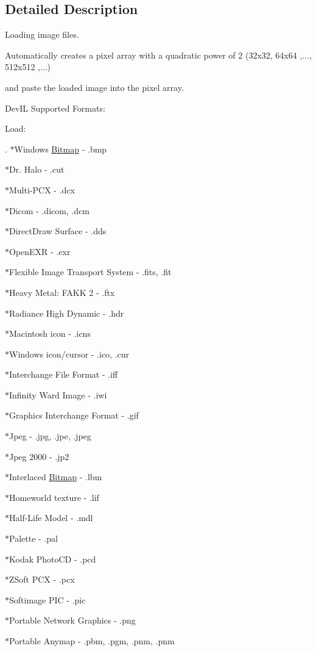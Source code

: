 \subsection{Detailed Description}
Loading image files. \par
 Automatically creates a pixel array with a quadratic power of 2 (32x32, 64x64 ,..., 512x512 ,...) \par
 and paste the loaded image into the pixel array. \par
 DevIL Supported Formats: \par
 Load: \par
. $\ast$Windows \hyperlink{class_f2_c_1_1_bitmap}{Bitmap} -\/ .bmp \par
 $\ast$Dr. Halo -\/ .cut \par
 $\ast$Multi-\/PCX -\/ .dcx \par
 $\ast$Dicom -\/ .dicom, .dcm \par
 $\ast$DirectDraw Surface -\/ .dds \par
 $\ast$OpenEXR -\/ .exr \par
 $\ast$Flexible Image Transport System -\/ .fits, .fit \par
 $\ast$Heavy Metal: FAKK 2 -\/ .ftx \par
 $\ast$Radiance High Dynamic -\/ .hdr \par
 $\ast$Macintosh icon -\/ .icns \par
 $\ast$Windows icon/cursor -\/ .ico, .cur \par
 $\ast$Interchange File Format -\/ .iff \par
 $\ast$Infinity Ward Image -\/ .iwi \par
 $\ast$Graphics Interchange Format -\/ .gif \par
 $\ast$Jpeg -\/ .jpg, .jpe, .jpeg \par
 $\ast$Jpeg 2000 -\/ .jp2 \par
 $\ast$Interlaced \hyperlink{class_f2_c_1_1_bitmap}{Bitmap} -\/ .lbm \par
 $\ast$Homeworld texture -\/ .lif \par
 $\ast$Half-\/Life Model -\/ .mdl \par
 $\ast$Palette -\/ .pal \par
 $\ast$Kodak PhotoCD -\/ .pcd \par
 $\ast$ZSoft PCX -\/ .pcx \par
 $\ast$Softimage PIC -\/ .pic \par
 $\ast$Portable Network Graphics -\/ .png \par
 $\ast$Portable Anymap -\/ .pbm, .pgm, .pnm, .pnm \par
